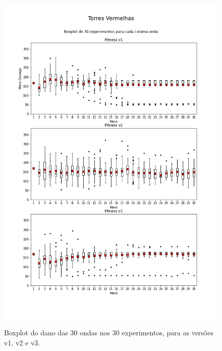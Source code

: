 \begin{figure}[H]
  \centering
  \includegraphics[width=1.1\textwidth]{figuras/td/boxplot Torres Vermelhas.png}
  \caption{Boxplot do dano das 30 ondas nos 30 experimentos, para as versões v1, v2 e v3.}
  \label{fig:td-box-red}
\end{figure}

